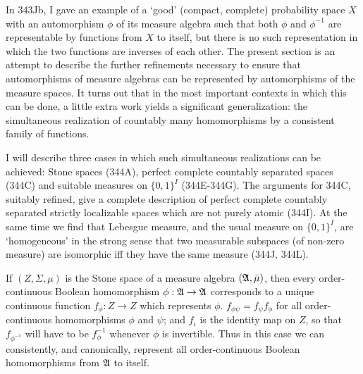
\def\chaptername{The lifting theorem}
\def\sectionname{Realization of automorphisms}


In 343Jb, I gave an example of a `good' (compact, complete) probability
space $X$ with an automorphism $\phi$ of its measure algebra such that
both $\phi$ and $\phi^{-1}$ are representable by functions from $X$ to
itself, but there is no such representation in which the two
functions are
inverses of each other.   The present section is an attempt to describe
the further refinements necessary to ensure that automorphisms of
measure algebras can be represented by automorphisms of the measure
spaces.   It turns out that in the most important contexts in which this
can be done, a little extra work yields a significant generalization:
the simultaneous realization of countably many homomorphisms by a
consistent family of functions.

I will describe three cases in which such simultaneous realizations can
be achieved:  Stone spaces (344A), perfect complete countably separated
spaces (344C) and suitable measures on $\{0,1\}^I$ (344E-344G).   The
arguments for 344C, suitably refined, give a complete description of
perfect complete countably separated strictly localizable spaces which
are not purely atomic (344I).   At the same time we
find that Lebesgue measure, and the usual measure on $\{0,1\}^I$, are
`homogeneous' in the strong sense that two measurable subspaces (of
non-zero measure) are isomorphic iff they have the same measure (344J,
344L).

 If $(Z,\Sigma,\mu)$ is the Stone space of a
measure algebra $(\frak A,\bar\mu)$, then every order-continuous Boolean
homomorphism
$\phi:\frak A\to\frak A$ corresponds to a unique continuous function
$f_{\phi}:Z\to Z$ which represents
$\phi$.
 $f_{\phi\psi}=f_{\psi}f_{\phi}$ for all
order-continuous homomorphisms $\phi$ and $\psi$;
and $f_{\iota}$ is the identity map on $Z$, so that
$f_{\phi^{-1}}$ will
have to be $f_{\phi}^{-1}$ whenever $\phi$ is invertible.
Thus in this case we can consistently, and
canonically,
represent all
order-continuous Boolean homomorphisms from $\frak A$ to itself.

